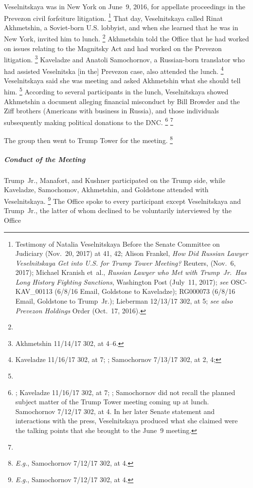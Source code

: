 Veselnitskaya was in New York on June~9, 2016, for appellate proceedings in the Prevezon civil forfeiture litigation.%
\footnote{Testimony of Natalia Veselnitskaya Before the Senate Committee on Judiciary (Nov.~20, 2017) at 41, 42;
Alison Frankel, \textit{How Did Russian Lawyer Veselnitskaya Get into U.S. for Trump Tower Meeting?} Reuters, (Nov.~6, 2017);
Michael Kranish et~al., \textit{Russian Lawyer who Met with Trump~Jr.\ Has Long History Fighting Sanctions}, Washington Post (July~11, 2017);
\textit{see} OSC-KAV\_00113 (6/8/16 Email, Goldstone to Kaveladze);
RG000073 (6/8/16 Email, Goldstone to Trump~Jr.);
Lieberman 12/13/17 302, at 5;
\textit{see also Prevezon Holdings} Order (Oct.~17, 2016).}
That day, Veselnitskaya called Rinat Akhmetshin, a Soviet-born U.S. lobbyist,
and when she learned that he was in New York, invited him to lunch.%
\footnote{}
Akhmetshin told the Office that he had worked on issues relating to the Magnitsky Act and had worked on the Prevezon litigation.%
\footnote{Akhmetshin 11/14/17 302, at 4--6. }
Kaveladze and Anatoli Samochornov, a Russian-born translator who had assisted Veselnitska [in the] Prevezon case, also attended the lunch.%
\footnote{Kaveladze 11/16/17 302, at 7;
;
Samochornov 7/13/17 302, at 2, 4;
}
 Veselnitskaya said she was meeting  and asked Akhmetshin what she should tell him.%
\footnote{}
According to several participants in the lunch, Veselnitskaya showed Akhmetshin a document alleging financial misconduct by Bill Browder and the Ziff brothers (Americans with business in Russia), and those individuals subsequently making political donations to the DNC\null.%
\footnote{;
Kaveladze 11/16/17 302, at 7;
;
Samochornov did not recall the planned subject matter of the Trump Tower meeting coming up at lunch.
 Samochornov 7/12/17 302, at 4.
In her later Senate statement and interactions with the press, Veselnitskaya produced what she claimed were the talking points that she brought to the June~9 meeting.}
\footnote{}

The group then went to Trump Tower for the meeting.%
\footnote{\textit{E.g.}, Samochornov 7/12/17 302, at 4.}

\subparagraph{Conduct of the Meeting}

Trump~Jr., Manafort, and Kushner participated on the Trump side, while Kaveladze, Samochomov, Akhmetshin, and Goldstone attended with Veselnitskaya.%
\footnote{\textit{E.g.}, Samochornov 7/12/17 302, at 4.}
The Office spoke to every participant except Veselnitskaya and Trump~Jr., the latter of whom declined to be voluntarily interviewed by the Office

